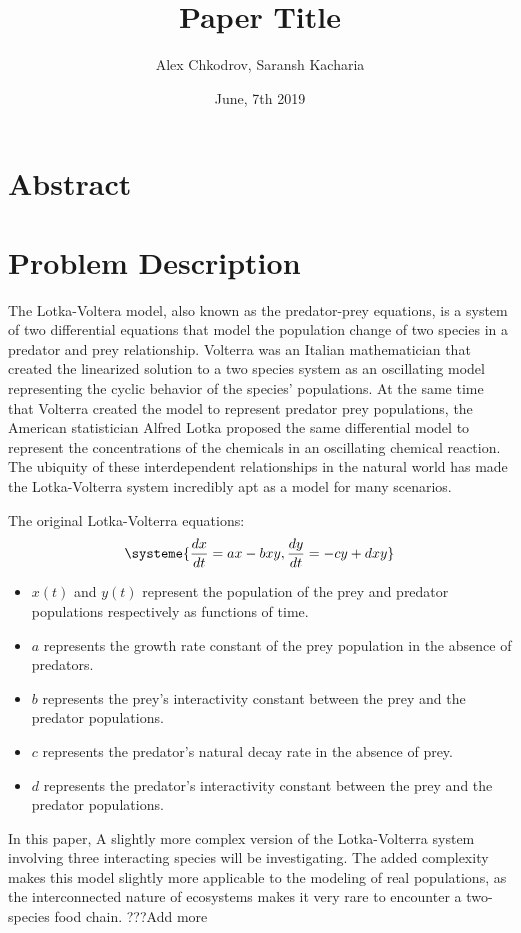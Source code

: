 \documentclass[11pt,oneside]{article}
\title{Paper Title}
\author{Alex Chkodrov, Saransh Kacharia}
\date{June, 7th 2019}
\begin{document}
	\maketitle
	\pagestyle{fancy}
	\section{Abstract}
	\section{Problem Description}
	The Lotka-Voltera model, also known as the predator-prey equations, is a system of two differential equations that model the population change of two species in a predator and prey relationship. Volterra was an Italian mathematician that created the linearized solution to a two species system as an oscillating model representing the cyclic behavior of the species' populations. At the same time that Volterra created the model to represent predator prey populations, the American statistician Alfred Lotka proposed the same differential model to represent the  concentrations of the chemicals in an oscillating chemical reaction. The ubiquity of these interdependent relationships in the natural world has made the Lotka-Volterra system incredibly apt as a model for many scenarios.
	
	The original Lotka-Volterra equations:
	\begin{equation}
	\systeme{
		\frac{dx}{dt} = ax - bxy,
		\frac{dy}{dt} = -cy + dxy
	}
	\end{equation}
	\begin{itemize}
		\item $x(t)$ and $y(t)$ represent the population of the prey and predator populations respectively as functions of time.
		\item $a$ represents the growth rate constant of the prey population in the absence of predators.
		\item $b$ represents the prey's interactivity constant between the prey and the predator populations.
		\item $c$ represents the predator's natural decay rate in the absence of prey.
		\item $d$ represents the predator's interactivity constant between the prey and the predator populations.
	\end{itemize}
	
	
	In this paper, A slightly more complex version of the Lotka-Volterra system involving three interacting species will be investigating. The added complexity makes this model slightly more applicable to the modeling of real populations, as the interconnected nature of ecosystems makes it very rare to encounter a two-species food chain. ???Add more
	
\end{document}
